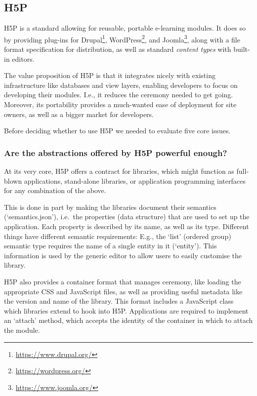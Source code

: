\subsection{H5P}

H5P is a standard allowing for reusable, portable e-learning modules. It does 
so by providing plug-ins for Drupal\footnote{\url{https://www.drupal.org/}}, 
WordPress\footnote{\url{https://wordpress.org/}}, and 
Joomla\footnote{\url{https://www.joomla.org/}}, along with a file format 
specification for distribution, as well as standard \emph{content types} with 
built-in editors.

The value proposition of H5P is that it integrates nicely with existing
infrastructure like databases and view layers, enabling developers to focus on
developing their modules.\cite{h5pwhy} I.e., it reduces the ceremony needed
to get going. Moreover, its portability provides a much-wanted ease of
deployment for site owners, as well as a bigger market for developers.

Before deciding whether to use H5P we needed to evaluate five core issues.

\subsubsection{Are the abstractions offered by H5P powerful enough?}

At its very core, H5P offers a contract for libraries, which might function as
full-blown applications, stand-alone libraries, or application programming 
interfaces for any combination of the above. 

This is done in part by making the libraries document their semantics
(`semantics.json'), i.e.\ the properties (data structure) that are used to set
up the application. Each property is described by its name, as well as its type.
Different things have different semantic requirements: E.g., the
`list' (ordered group) semantic type requires the name of a single entity in it
(`entity'). This information is used by the generic editor to allow users to
easily customise the library.

H5P also provides a container format that manages ceremony, like loading
the appropriate CSS and JavaScript files, as well as providing useful metadata 
like the version and name of the library. This format includes a JavaScript 
class which libraries extend to hook into H5P. Applications are required to 
implement an `attach' method, which accepts the identity of the container in 
which to attach the module.

